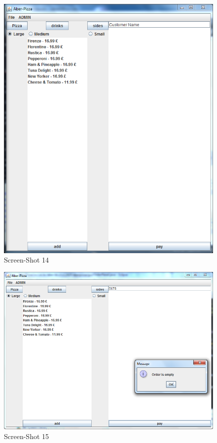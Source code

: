 \documentclass[11pt,a4paper]{article}
\begin{document}
\begin{flushleft}
\begin{figure}[ht]
	\centering
 	\includegraphics[scale=0.4]{../Sceenshots/Capture.PNG} 
	\caption{Screen-Shot 14}
\end{figure}

\begin{figure}[ht]
	\centering
 	\includegraphics[scale = 0.4]{../Sceenshots/noCheckout.PNG} 
	\caption{Screen-Shot 15}
\end{figure}


\end{flushleft}
\end{document}
